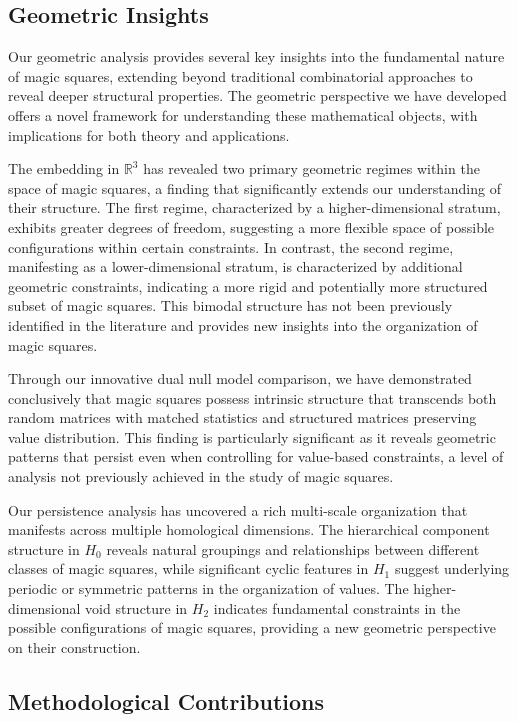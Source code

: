 \subsection{Geometric Insights}
\label{subsec:geometric_insights}

Our geometric analysis provides several key insights into the fundamental nature of magic squares, extending beyond traditional combinatorial approaches to reveal deeper structural properties. The geometric perspective we have developed offers a novel framework for understanding these mathematical objects, with implications for both theory and applications.

The embedding in $\mathbb{R}^3$ has revealed two primary geometric regimes within the space of magic squares, a finding that significantly extends our understanding of their structure. The first regime, characterized by a higher-dimensional stratum, exhibits greater degrees of freedom, suggesting a more flexible space of possible configurations within certain constraints. In contrast, the second regime, manifesting as a lower-dimensional stratum, is characterized by additional geometric constraints, indicating a more rigid and potentially more structured subset of magic squares. This bimodal structure has not been previously identified in the literature and provides new insights into the organization of magic squares.

Through our innovative dual null model comparison, we have demonstrated conclusively that magic squares possess intrinsic structure that transcends both random matrices with matched statistics and structured matrices preserving value distribution. This finding is particularly significant as it reveals geometric patterns that persist even when controlling for value-based constraints, a level of analysis not previously achieved in the study of magic squares.

Our persistence analysis has uncovered a rich multi-scale organization that manifests across multiple homological dimensions. The hierarchical component structure in $H_0$ reveals natural groupings and relationships between different classes of magic squares, while significant cyclic features in $H_1$ suggest underlying periodic or symmetric patterns in the organization of values. The higher-dimensional void structure in $H_2$ indicates fundamental constraints in the possible configurations of magic squares, providing a new geometric perspective on their construction.

\subsection{Methodological Contributions}
\label{subsec:methodological}

